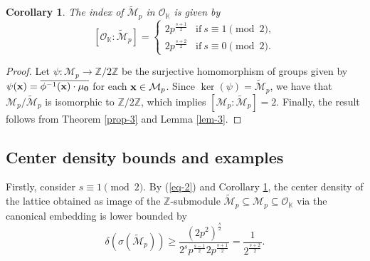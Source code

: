 \documentclass{amsart}
\newtheorem{corollary}[theorem]{Corollary}
\begin{document}
\begin{corollary}\label{corol_indice} The index of $\tilde{\mathcal{M}}_p$ in $\mathcal{O}_\mathbb{K}$ is given by
$$[\mathcal{O}_{\mathbb{K}}:\tilde{\mathcal{M}}_p]=\left\{\begin{matrix}
   2p^{\frac{s+1}{2}}  &  \mbox{if}~s\equiv 1\pmod 2,\\
   2p^{\frac{s+2}{2}}  &  \mbox{if}~s\equiv 0\pmod 2. \end{matrix}\right.$$ 
\end{corollary} \begin{proof} Let $\psi:\mathcal{M}_p\rightarrow \mathbb{Z}/2\mathbb{Z}$ be the surjective homomorphism of groups given by $\psi({\bf x})=\overline{\phi^{-1}({\bf x})\cdot{\bf \mu_0}}$ for each ${\bf x}\in\mathcal{M}_p$. Since $\ker(\psi) = \tilde{\mathcal{M}}_p$, we have that $\mathcal{M}_p/\tilde{\mathcal{M}}_p$ is isomorphic to $\mathbb{Z}/2\mathbb{Z}$, which implies $[\mathcal{M}_p:\tilde{\mathcal{M}}_p]=2$. Finally, the result follows from Theorem \ref{prop-3} and Lemma \ref{lem-3}.\end{proof}

\subsection{Center density bounds and examples} Firstly, consider $s\equiv 1\pmod 2$. By (\ref{eq-2}) and Corollary \ref{corol_indice}, the center density of the lattice obtained as image of the $\mathbb{Z}$-submodule $\tilde{\mathcal{M}}_p\subseteq \mathcal{M}_p\subseteq\mathcal{O}_\mathbb{K}$ via the canonical embedding is lower bounded by
\begin{equation}\label{conclusao_s1}
\delta(\sigma(\tilde{\mathcal{M}}_p)) \geq \frac{(2p^2)^{\frac{s}{2}}}{2^sp^{\frac{s-1}{2}}2p^{\frac{s+1}{2}}} = \frac{1}{2^{\frac{s+2}{2}}}.
\end{equation}
\end{document}
